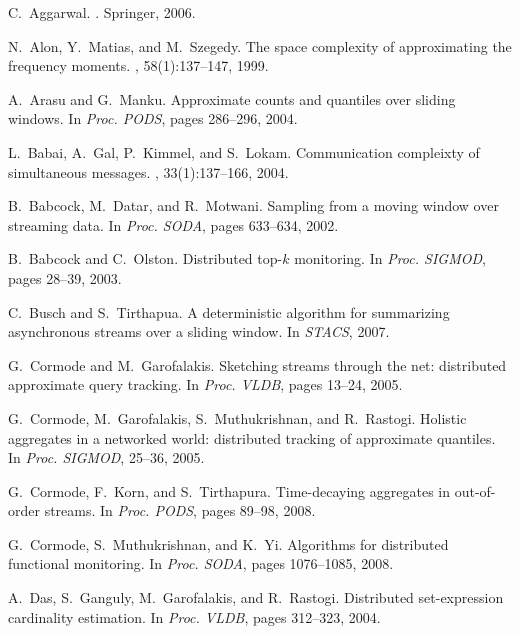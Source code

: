 \documentclass[proceedings]{stacs}
\theoremstyle{definition}\newtheorem{fact}{Fact}
\begin{document}

\begin{thebibliography}{10}
\small


C.~Aggarwal.
.
\newblock Springer, 2006.

N.~Alon, Y.~Matias, and M.~Szegedy.
\newblock The space complexity of approximating the frequency moments.
, 58(1):137--147, 1999.

A.~Arasu and G.~Manku.
\newblock Approximate counts and quantiles over sliding windows.
\newblock In {\em Proc. PODS}, pages 286--296, 2004.

L.~Babai, A.~Gal, P.~Kimmel, and S.~Lokam.
\newblock Communication compleixty of simultaneous messages.
, 33(1):137--166, 2004.

B.~Babcock, M.~Datar, and R.~Motwani.
\newblock Sampling from a moving window over streaming data.
\newblock In {\em Proc. SODA}, pages 633--634, 2002.

B.~Babcock and C.~Olston.
\newblock Distributed top-$k$ monitoring.
\newblock In {\em Proc. SIGMOD}, pages 28--39, 2003.

C.~Busch and S.~Tirthapua.
\newblock A deterministic algorithm for summarizing asynchronous streams over a
  sliding window.
\newblock In {\em STACS}, 2007.

G.~Cormode and M.~Garofalakis.
\newblock Sketching streams through the net: distributed approximate query
  tracking.
\newblock In {\em Proc. VLDB}, pages 13--24, 2005.

G.~Cormode, M.~Garofalakis, S.~Muthukrishnan, and R.~Rastogi.
\newblock Holistic aggregates in a networked world: distributed tracking of
  approximate quantiles.
\newblock In {\em Proc. SIGMOD}, 25--36, 2005.

G.~Cormode, F.~Korn, and S.~Tirthapura.
\newblock Time-decaying aggregates in out-of-order streams.
\newblock In {\em Proc. PODS}, pages 89--98, 2008.

G.~Cormode, S.~Muthukrishnan, and K.~Yi.
\newblock Algorithms for distributed functional monitoring.
\newblock In {\em Proc. SODA}, pages 1076--1085, 2008.

A.~Das, S.~Ganguly, M.~Garofalakis, and R.~Rastogi.
\newblock Distributed set-expression cardinality estimation.
\newblock In {\em Proc. VLDB}, pages 312--323, 2004.


\end{thebibliography}
\end{document}
